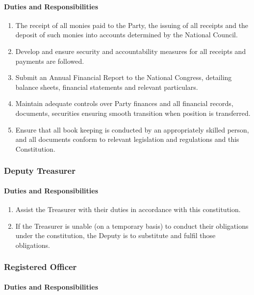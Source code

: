 \documentclass[a4paper,titlepage,8.5pt]{article}
\begin{document}
\paragraph{Duties and Responsibilities}

\begin{enumerate}
\item The receipt of all monies paid to the Party, the issuing of all receipts and the deposit of such monies into accounts determined by the National Council.
\item Develop and ensure security and accountability measures for all receipts and payments are followed.
\item Submit an Annual Financial Report to the National Congress, detailing balance sheets, financial statements and relevant particulars.
\item Maintain adequate controls over Party finances and all financial records, documents, securities ensuring smooth transition when position is transferred.
\item Ensure that all book keeping is conducted by an appropriately skilled person, and all documents conform to relevant legislation and regulations and this Constitution.
\end{enumerate}

\subsubsection{Deputy Treasurer}

\paragraph{Duties and Responsibilities}

\begin{enumerate}
\item Assist the Treasurer with their duties in accordance with this constitution.
\item If the Treasurer is unable (on a temporary basis) to conduct their obligations under the constitution, the Deputy is to substitute and fulfil those obligations.
\end{enumerate}

\subsubsection{Registered Officer}

\paragraph{Duties and Responsibilities}
\end{document}

